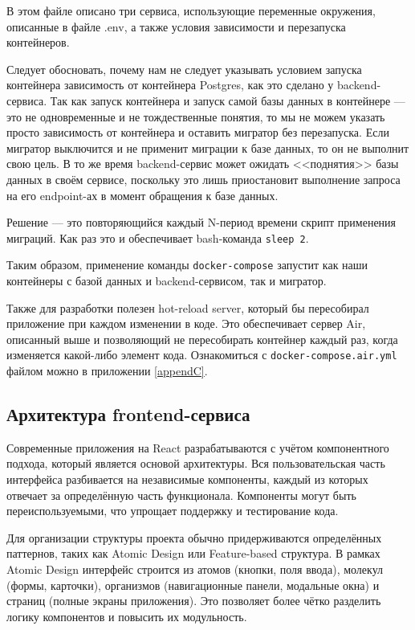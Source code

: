 \documentclass[diploma]{SCWorks}
\begin{document}
В этом файле описано три сервиса, использующие переменные окружения, описанные
в файле .env, а также условия зависимости и перезапуска контейнеров.

Следует обосновать, почему нам не следует указывать условием запуска контейнера
зависимость от контейнера Postgres, как это сделано у backend-сервиса. Так как
запуск контейнера и запуск самой базы данных в контейнере — это не одновременные
и не тождественные понятия, то мы не можем указать просто зависимость от 
контейнера и оставить мигратор без перезапуска. Если мигратор выключится и не 
применит миграции к базе данных, то он не выполнит свою цель. В то же время
backend-сервис может ожидать <<поднятия>> базы данных в своём сервисе, поскольку
это лишь приостановит выполнение запроса на его endpoint-ах в момент обращения
к базе данных.

Решение — это повторяющийся каждый N-период времени скрипт применения миграций.
Как раз это и обеспечивает bash-команда \texttt{sleep 2}.

Таким образом, применение команды \texttt{docker-compose} запустит как 
наши контейнеры с базой данных и backend-сервисом, так и мигратор.

Также для разработки полезен hot-reload server, который бы пересобирал 
приложение при каждом изменении в коде. Это обеспечивает сервер Air, описанный
выше и позволяющий не пересобирать контейнер каждый раз, когда изменяется 
какой-либо элемент кода. Ознакомиться с \texttt{docker-compose.air.yml} файлом 
можно в приложении \ref{appendC}.

\subsection{Архитектура frontend-сервиса}

Современные приложения на React разрабатываются с учётом компонентного подхода, 
который является основой архитектуры. Вся пользовательская часть интерфейса 
разбивается на независимые компоненты, каждый из которых отвечает за 
определённую часть функционала. Компоненты могут быть переиспользуемыми, 
что упрощает поддержку и тестирование кода. 


Для организации структуры проекта обычно придерживаются определённых паттернов, 
таких как Atomic Design или Feature-based структура. В рамках Atomic Design 
интерфейс строится из атомов (кнопки, поля ввода), молекул (формы, карточки), 
организмов (навигационные панели, модальные окна) и страниц 
(полные экраны приложения). Это позволяет более чётко разделить логику 
компонентов и повысить их модульность.
\end{document}
